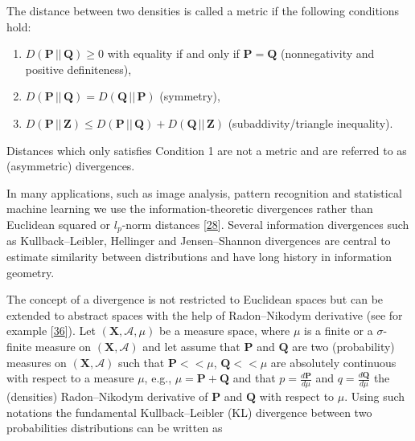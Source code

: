 The distance between two densities is called a metric if the following conditions hold:

\begin{enumerate}
\item \(D(\mathbf{P}\,||\,\mathbf{Q}) \geq 0\) with equality if and only if \(\mathbf{P} = \mathbf{Q}\) (nonnegativity and positive definiteness),


\item \(D(\mathbf{P}\,||\,\mathbf{Q}) = D(\mathbf{Q}\,||\,\mathbf{P})\) (symmetry),


\item \(D(\mathbf{P}\,||\,\mathbf{Z}) \leq D(\mathbf{P}\,||\,\mathbf{Q}) + D(\mathbf{Q}\,||\,\mathbf{Z})\) (subaddivity/triangle inequality).

\end{enumerate}





Distances which only satisfies Condition 1 are not a metric and are referred to as (asymmetric) divergences.


In many applications, such as image analysis, pattern recognition and statistical machine learning we use the information-theoretic divergences rather than Euclidean squared or \(l_{p}\)-norm distances [\hyperlink{B28-entropy-12-01532}{28}]. Several information divergences such as Kullback–Leibler, Hellinger and Jensen–Shannon divergences are central to estimate similarity between distributions and have long history in information geometry.


The concept of a divergence is not restricted to Euclidean spaces but can be extended to abstract spaces with the help of Radon–Nikodym derivative (see for example [\hyperlink{B36-entropy-12-01532}{36}]). Let \((\mathbf{X},\mathcal{A},\mu)\) be a measure space, where \(\mu\) is a finite or a \(\sigma\)-finite measure on \((\mathbf{X},\mathcal{A})\) and let assume that \(\mathbf{P}\) and \(\mathbf{Q}\) are two (probability) measures on \((\mathbf{X},\mathcal{A})\) such that \(\mathbf{P} < < \mu\), \(\mathbf{Q} < < \mu\) are absolutely continuous with respect to a measure \(\mu\), e.g., \(\mu = \mathbf{P} + \mathbf{Q}\) and that \(p = \frac{d\mathbf{P}}{d\mu}\) and \(q = \frac{d\mathbf{Q}}{d\mu}\) the (densities) Radon–Nikodym derivative of \(\mathbf{P}\) and \(\mathbf{Q}\) with respect to \(\mu\). Using such notations the fundamental Kullback–Leibler (KL) divergence between two probabilities distributions can be written as

